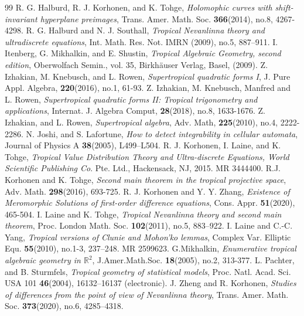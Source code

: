 \documentclass{article}
\begin{document}
\begin{thebibliography}{99}
 R. G. Halburd, R. J. Korhonen, and K. Tohge, \textit{Holomophic curves with shift-invariant hyperplane preimages}, Trans. Amer. Math. Soc. \textbf{366}(2014), no.8, 4267-4298.
 R. G. Halburd and N. J. Southall, \textit{Tropical Nevanlinna theory and ultradiscrete equations}, Int. Math. Res. Not. IMRN (2009), no.5, 887–911.
 I. Itenberg, G. Mikhalkin, and E. Shustin, \textit{Tropical Algebraic Geometry, second edition}, Oberwolfach
Semin., vol. 35, Birkhäuser Verlag, Basel, (2009).
 Z. Izhakian, M. Knebusch, and L. Rowen, \textit{Supertropical quadratic forms I}, J. Pure Appl. Algebra, \textbf{220}(2016), no.1, 61-93.
 Z. Izhakian, M. Knebusch, Manfred and L. Rowen, \textit{Supertropical quadratic forms II: Tropical trigonometry and applications}, Internat. J. Algebra Comput, \textbf{28}(2018), no.8, 1633-1676.
 Z. Izhakian, and L. Rowen, \textit{Supertropical algebra}, Adv. Math, \textbf{225}(2010), no.4, 2222-2286.
 N. Joshi, and S. Lafortune, \textit{How to detect integrability in cellular automata}, Journal of Physics A \textbf{38}(2005), L499–L504.
 R. J. Korhonen, I. Laine, and K. Tohge, \textit{Tropical Value Distribution Theory and Ultra-discrete Equations, World Scientific Publishing Co}. Pte. Ltd., Hackensack, NJ, 2015. MR 3444400.
 R.J. Korhonen and K. Tohge, \textit{Second main theorem in the tropical projective space}, Adv. Math. \textbf{298}(2016), 693-725.
 R. J. Korhonen and Y. Y. Zhang, \textit{Existence of Meromorphic Solutions of first-order difference equations}, Cons. Appr. \textbf{51}(2020), 465-504.
I. Laine and K. Tohge, \textit{Tropical Nevanlinna theory and second main theorem}, Proc. London Math. Soc. \textbf{102}(2011), no.5, 883–922.
 I. Laine and C.-C. Yang, \textit{Tropical versions of Clunie and Mohon’ko lemmas}, Complex Var. Elliptic Equ. \textbf{55}(2010), no.1-3, 237–248. MR 2599623.
 G.Mikhalkin, \textit{Enumerative tropical algebraic geometry in $\mathbb{R}^{2}$}, J.Amer.Math.Soc. \textbf{18}(2005), no.2, 313-377.
 L. Pachter, and B. Sturmfels, \textit{Tropical geometry of statistical models}, Proc. Natl. Acad. Sci. USA
101 \textbf{46}(2004), 16132–16137 (electronic).
 J. Zheng and R. Korhonen, \textit{Studies of differences from the point of view of Nevanlinna theory}, Trans. Amer. Math. Soc. \textbf{373}(2020), no.6, 4285–4318.
\end{thebibliography}
\end{document}
